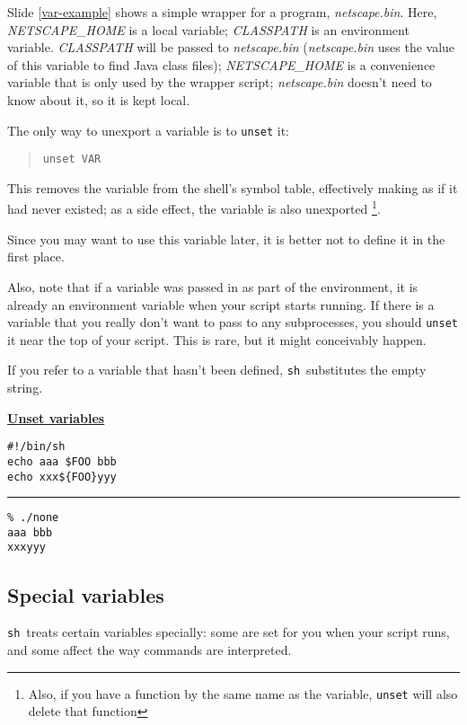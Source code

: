 \documentclass{article}
\newcommand{\heading}[1]{%
  \begin{center}
    \large\textbf{\underline{#1}}
  \end{center}
  \vspace{1ex minus 1ex}}
\newcommand{\fname}[1]{\textsl{#1}}
\newcommand{\code}[1]{\texttt{#1}}
\newcommand{\sh}{\code{sh}}
\newlength{\slidewidth}
\newenvironment{boxit}{%
  \begin{lrbox}{\savepar}
  \begin{minipage}[b]{\slidewidth}%
}{
  \end{minipage}
  \end{lrbox}
  \fbox{\usebox{\savepar}}
}
\newcommand{\slidecaption}{}
\newenvironment{slide}[1]{%
\renewcommand\figurename{Slide}
\renewcommand{\slidecaption}{#1}
\bigskip
\begin{boxit}
\heading{\slidecaption}
}{%
\end{boxit}
\bigskip
}
\begin{document}
\begin{sloppypar}
	Slide \ref{var-example} shows a simple wrapper for a program,
\fname{netscape.bin}. Here, \fname{NETSCAPE\_HOME} is a local variable;
\fname{CLASSPATH} is an environment variable. \fname{CLASSPATH} will
be passed to \fname{netscape.bin} (\fname{netscape.bin} uses the value
of this variable to find Java class files);
\fname{NETSCAPE\_HOME} is a
convenience variable that is only used by the wrapper script;
\fname{netscape.bin} doesn't need to know about it, so it is kept
local.
\end{sloppypar}

	The only way to unexport a variable is to \code{unset} it:
\begin{quote}
\code{unset VAR}
\end{quote}
This removes the variable from the shell's symbol table, effectively
making as if it had never existed; as a side effect, the variable is
also unexported%
\footnote{Also, if you have a function by the same name as the
variable, \code{unset} will also delete that function}.

	Since you may want to use this variable later, it is better
not to define it in the first place.

	Also, note that if a variable was passed in as part of the
environment, it is already an environment variable when your script
starts running. If there is a variable that you really don't want to
pass to any subprocesses, you should \code{unset} it near the top of
your script. This is rare, but it might conceivably happen.

	If you refer to a variable that hasn't been defined, \sh\
substitutes the empty string.

\begin{slide}{Unset variables}
\begin{verbatim}
#!/bin/sh
echo aaa $FOO bbb
echo xxx${FOO}yyy
\end{verbatim}
\bigskip\hrule\bigskip
\begin{verbatim}
% ./none
aaa bbb
xxxyyy
\end{verbatim}%
\end{slide}

\subsection{Special variables}

	\sh\ treats certain variables specially: some are set for you
when your script runs, and some affect the way commands are
interpreted.
\end{document}
